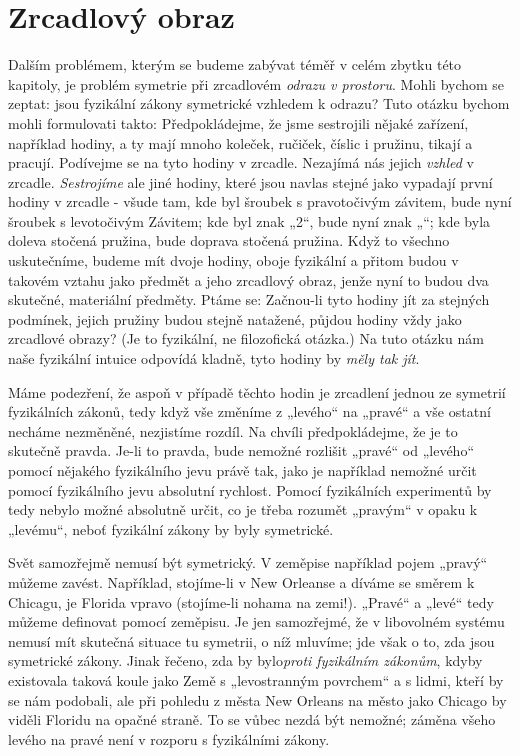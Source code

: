   \section{Zrcadlový obraz}\label{fyz:IchapLIIsecIV}
    Dalším problémem, kterým se budeme zabývat téměř v celém zbytku této kapitoly, je problém
    symetrie při zrcadlovém \emph{odrazu v prostoru}. Mohli bychom se zeptat: jsou fyzikální zákony
    symetrické vzhledem k odrazu? Tuto otázku bychom mohli formulovati takto: Předpokládejme, že
    jsme sestrojili nějaké zařízení, například hodiny, a ty mají mnoho koleček, ručiček, číslic i
    pružinu, tikají a pracují. Podívejme se na tyto hodiny v zrcadle. Nezajímá nás jejich
    \emph{vzhled} v zrcadle. \emph{Sestrojíme} ale jiné hodiny, které jsou navlas stejné jako
    vypadají první hodiny v zrcadle - všude tam, kde byl šroubek s pravotočivým závitem, bude nyní
    šroubek s levotočivým Závitem; kde byl znak „2“, bude nyní znak „“; kde byla
    doleva stočená pružina, bude doprava stočená pružina. Když to všechno uskutečníme, budeme mít
    dvoje hodiny, oboje fyzikální a přitom budou v takovém vztahu jako předmět a jeho zrcadlový
    obraz, jenže nyní to budou dva skutečné, materiální předměty. Ptáme se: Začnou-li tyto hodiny
    jít za stejných podmínek, jejich pružiny budou stejně natažené, půjdou hodiny vždy jako
    zrcadlové obrazy? (Je to fyzikální, ne ﬁlozofická otázka.) Na tuto otázku nám naše fyzikální
    intuice odpovídá kladně, tyto hodiny by \emph{měly tak jít}.

    Máme podezření, že aspoň v případě těchto hodin je zrcadlení jednou ze symetrií fyzikálních
    zákonů, tedy když vše změníme z „levého“ na „pravé“ a vše ostatní necháme nezměněné, nezjistíme
    rozdíl. Na chvíli předpokládejme, že je to skutečně pravda. Je-li to pravda, bude nemožné
    rozlišit „pravé“ od „levého“ pomocí nějakého fyzikálního jevu právě tak, jako je například
    nemožné určit pomocí fyzikálního jevu absolutní rychlost. Pomocí fyzikálních experimentů by tedy
    nebylo možné absolutně určit, co je třeba rozumět „pravým“ v opaku k „levému“, neboť fyzikální
    zákony by byly symetrické.

    Svět samozřejmě nemusí být symetrický. V zeměpise například pojem „pravý“ můžeme zavést.
    Například, stojíme-li v New Orleanse a díváme se směrem k Chicagu, je Florida vpravo (stojíme-li
    nohama na zemi!). „Pravé“ a „levé“ tedy můžeme deﬁnovat pomocí zeměpisu. Je jen samozřejmé, že v
    libovolném systému nemusí mít skutečná situace tu symetrii, o níž mluvíme; jde však o to, zda
    jsou symetrické zákony. Jinak řečeno, zda by bylo\emph{proti fyzikálním zákonům}, kdyby
    existovala taková koule jako Země s „levostranným povrchem“ a s lidmi, kteří by se nám podobali,
    ale při pohledu z města New Orleans na město jako Chicago by viděli Floridu na opačné straně. To
    se vůbec nezdá být nemožné; záměna všeho levého na pravé není v rozporu s fyzikálními zákony.

